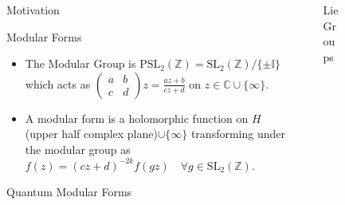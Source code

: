 \documentclass[final,10pt]{beamer}
\newlength{\sepwidth}
\newlength{\colwidth}
\newcommand{\separatorcolumn}{\begin{column}{\sepwidth}\end{column}}
\newcommand{\C}{\mathbb{C}}
\newcommand{\Z}{\mathbb{Z}}
\newcommand{\I}{\mathbb{I}}
\begin{document}
\begin{frame}[t]
\begin{columns}[t]
\separatorcolumn

\begin{column}{\colwidth}


\begin{block}{Motivation}

\end{block}


\begin{block}{Modular Forms}
\begin{itemize}
    \item The Modular Group is $\text{PSL}_2(\Z)=\text{SL}_2(\Z)/\{\pm \I\}$ which acts as $\left(\!\begin{smallmatrix}a&b\\c&d\end{smallmatrix}\!\right) z = \frac{az+b}{cz+d}$ on $z\in\C\cup\{\infty\}$.
    \item A modular form is a holomorphic function on $H$(upper half complex plane)$\cup\{\infty\}$ transforming under the modular group as $f(z)=(cz+d)^{-2k}f(gz)\quad \forall g\in\mathrm{SL}_2(\Z)$.
\end{itemize}
\end{block}


\begin{block}{Quantum Modular Forms}
\end{block}

\end{column}
\separatorcolumn


\begin{column}{\colwidth}

\begin{block}{Lie Groups}
  
\end{block}


\end{column}

\separatorcolumn

\begin{column}{\colwidth}
\end{column}

\separatorcolumn
\end{columns}
\end{frame}
\end{document}
